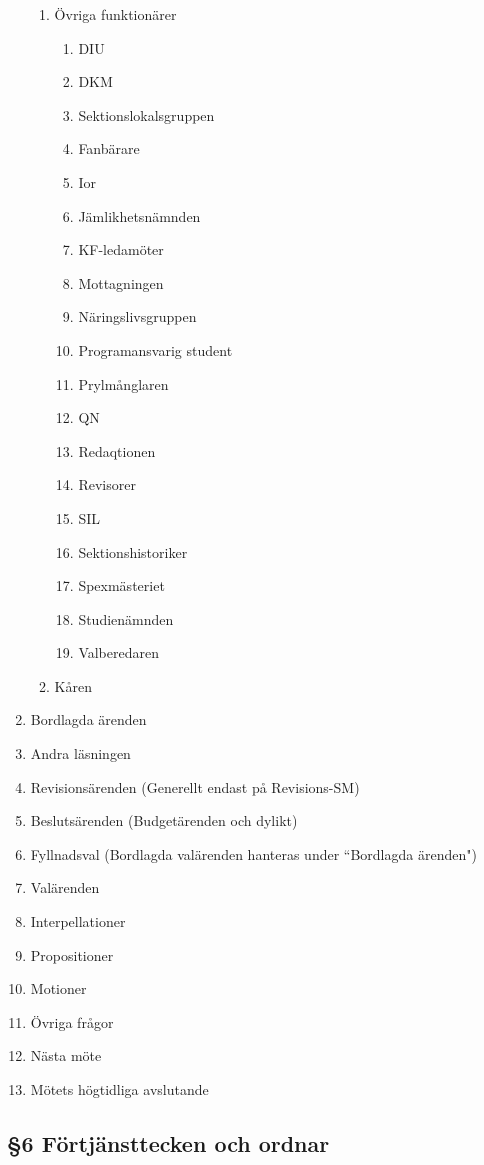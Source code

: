 \begin{enumerate}
\begin{enumerate}
  \item Övriga funktionärer\begin{enumerate}
  \item DIU
  \item DKM
  \item Sektionslokalsgruppen
  \item Fanbärare
  \item Ior
  \item Jämlikhetsnämnden
  \item KF-ledamöter
  \item Mottagningen
  \item Näringslivsgruppen
  \item Programansvarig student
  \item Prylmånglaren
  \item QN
  \item Redaqtionen
  \item Revisorer
  \item SIL
  \item Sektionshistoriker
  \item Spexmästeriet
  \item Studienämnden
  \item Valberedaren
\end{enumerate}


  \item Kåren
\end{enumerate}


  \item Bordlagda ärenden
  \item Andra läsningen
  \item Revisionsärenden (Generellt endast på Revisions-SM)
  \item Beslutsärenden (Budgetärenden och dylikt)
  \item Fyllnadsval (Bordlagda valärenden hanteras under ``Bordlagda ärenden")
  \item Valärenden
  \item Interpellationer
  \item Propositioner
  \item Motioner
  \item Övriga frågor
  \item Nästa möte
  \item Mötets högtidliga avslutande
\end{enumerate}

\subsection{§6 Förtjänsttecken och ordnar}


